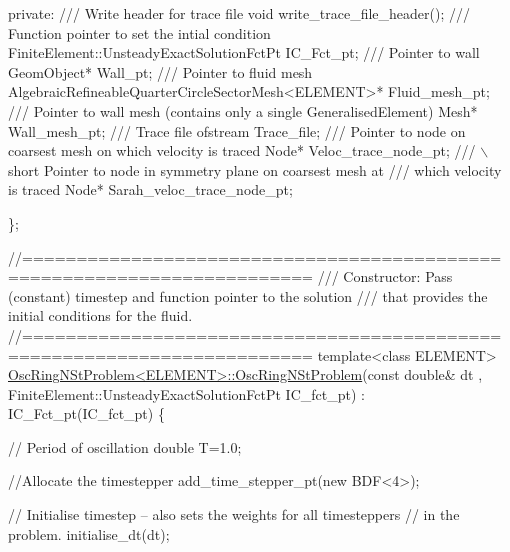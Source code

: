 \begin{DoxyCodeInclude}
\textcolor{keyword}{private}:
\textcolor{comment}{}
\textcolor{comment}{ /// Write header for trace file}
\textcolor{comment}{} \textcolor{keywordtype}{void} write\_trace\_file\_header();
\textcolor{comment}{}
\textcolor{comment}{ /// Function pointer to set the intial condition}
\textcolor{comment}{} FiniteElement::UnsteadyExactSolutionFctPt IC\_Fct\_pt;
\textcolor{comment}{}
\textcolor{comment}{ /// Pointer to wall}
\textcolor{comment}{} GeomObject* Wall\_pt;
\textcolor{comment}{}
\textcolor{comment}{ /// Pointer to fluid mesh}
\textcolor{comment}{} AlgebraicRefineableQuarterCircleSectorMesh<ELEMENT>* Fluid\_mesh\_pt;
\textcolor{comment}{}
\textcolor{comment}{ /// Pointer to wall mesh (contains only a single GeneralisedElement)}
\textcolor{comment}{} Mesh* Wall\_mesh\_pt;
\textcolor{comment}{}
\textcolor{comment}{ /// Trace file}
\textcolor{comment}{} ofstream Trace\_file;
\textcolor{comment}{}
\textcolor{comment}{ /// Pointer to node on coarsest mesh on which velocity is traced}
\textcolor{comment}{} Node* Veloc\_trace\_node\_pt;
\textcolor{comment}{}
\textcolor{comment}{ /// \(\backslash\)short Pointer to node in symmetry plane on coarsest mesh at }
\textcolor{comment}{ /// which velocity is traced}
\textcolor{comment}{} Node* Sarah\_veloc\_trace\_node\_pt;

\};


\textcolor{comment}{//========================================================================}\textcolor{comment}{}
\textcolor{comment}{/// Constructor: Pass (constant) timestep and function pointer to the solution }
\textcolor{comment}{/// that provides the initial conditions for the fluid.}
\textcolor{comment}{}\textcolor{comment}{//========================================================================}
\textcolor{keyword}{template}<\textcolor{keyword}{class} ELEMENT>
\hyperlink{classOscRingNStProblem_acd5f633c43eb4cfb43c45361ecf85e6b}{OscRingNStProblem<ELEMENT>::OscRingNStProblem}(\textcolor{keyword}{const} \textcolor{keywordtype}{double}& dt
      , 
FiniteElement::UnsteadyExactSolutionFctPt IC\_fct\_pt) : IC\_Fct\_pt(IC\_fct\_pt)
\{ 

 \textcolor{comment}{// Period of oscillation}
 \textcolor{keywordtype}{double} T=1.0;

 \textcolor{comment}{//Allocate the timestepper}
 add\_time\_stepper\_pt(\textcolor{keyword}{new} BDF<4>);

 \textcolor{comment}{// Initialise timestep -- also sets the weights for all timesteppers}
 \textcolor{comment}{// in the problem.}
 initialise\_dt(dt);


\end{DoxyCodeInclude}
